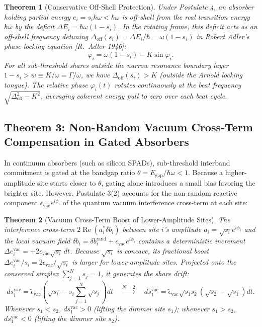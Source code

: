\documentclass[11pt,a4paper]{article}
\newtheorem{theorem}{Theorem}
\begin{document}
\begin{theorem}[Conservative Off-Shell Protection]
Under Postulate 4, an absorber holding partial energy $e_i = s_i \hbar\omega < \hbar\omega$ is off-shell from the real transition energy $\hbar\omega$ by the deficit $\Delta E_i = \hbar\omega(1 - s_i)$. In the rotating frame, this deficit acts as an off-shell frequency detuning $\Delta_{\mathrm{off}}(s_i) = \Delta E_i/\hbar = \omega(1 - s_i)$ in Robert Adler's phase-locking equation [R.\ Adler 1946]:
\begin{equation}
    \dot{\varphi}_i = \omega(1 - s_i) - K\sin\varphi_i.
\end{equation}
For all sub-threshold shares outside the narrow resonance boundary layer $1 - s_i > w \equiv K/\omega = \Gamma/\omega$, we have $\Delta_{\mathrm{off}}(s_i) > K$ (outside the Arnold locking tongue). The relative phase $\varphi_i(t)$ rotates continuously at the beat frequency $\sqrt{\Delta_{\mathrm{off}}^2 - K^2}$, averaging coherent energy pull to zero over each beat cycle.
\end{theorem}

\subsection{Theorem 3: Non-Random Vacuum Cross-Term Compensation in Gated Absorbers}

In continuum absorbers (such as silicon SPADs), sub-threshold interband commitment is gated at the bandgap ratio $\theta = E_{\mathrm{gap}}/\hbar\omega < 1$. Because a higher-amplitude site starts closer to $\theta$, gating alone introduces a small bias favoring the brighter site. However, Postulate 3(2) accounts for the non-random reactive component $\epsilon_{\mathrm{vac}}e^{i\phi_i}$ of the quantum vacuum interference cross-term at each site:

\begin{theorem}[Vacuum Cross-Term Boost of Lower-Amplitude Sites]
The interference cross-term $2\operatorname{Re}(a_i^* \delta b_i)$ between site $i$'s amplitude $a_i = \sqrt{s_i}e^{i\phi_i}$ and the local vacuum field $\delta b_i = \delta b_i^{\mathrm{rand}} + \epsilon_{\mathrm{vac}}e^{i\phi_i}$ contains a deterministic increment $\Delta e_i^{\mathrm{vac}} = +2\epsilon_{\mathrm{vac}}\sqrt{s_i}\,dt$. Because $\sqrt{s_i}$ is concave, its fractional boost $\Delta e_i^{\mathrm{vac}}/s_i = 2\epsilon_{\mathrm{vac}}/\sqrt{s_i}$ is larger for lower-amplitude sites. Projected onto the conserved simplex $\sum_{j=1}^N s_j = 1$, it generates the share drift:
\begin{equation}
    ds_i^{\mathrm{vac}} = \tilde{\epsilon}_{\mathrm{vac}}\left(\sqrt{s_i} - s_i \sum_{j=1}^N \sqrt{s_j}\right)dt \quad \xrightarrow{N=2} \quad ds_1^{\mathrm{vac}} = \tilde{\epsilon}_{\mathrm{vac}}\sqrt{s_1 s_2}\left(\sqrt{s_2} - \sqrt{s_1}\right)dt.
\end{equation}
Whenever $s_1 < s_2$, $ds_1^{\mathrm{vac}} > 0$ (lifting the dimmer site $s_1$); whenever $s_1 > s_2$, $ds_1^{\mathrm{vac}} < 0$ (lifting the dimmer site $s_2$).
\end{theorem}
\end{document}
